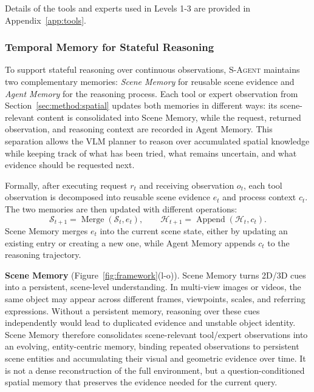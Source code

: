 Details of the tools and experts used in Levels 1-3 are provided in Appendix~\ref{app:tools}.


\subsubsection{Temporal Memory for Stateful Reasoning}
\label{sec:method:memory}
To support stateful reasoning over continuous observations, \textsc{S-Agent} maintains two complementary memories: \textit{Scene Memory} for reusable scene evidence and \textit{Agent Memory} for the reasoning process. 
Each tool or expert observation from Section~\ref{sec:method:spatial} updates both memories in different ways: its scene-relevant content is consolidated into Scene Memory, while the request, returned observation, and reasoning context are recorded in Agent Memory. 
This separation allows the VLM planner to reason over accumulated spatial knowledge while keeping track of what has been tried, what remains uncertain, and what evidence should be requested next.

Formally, after executing request $r_t$ and receiving observation $o_t$, each tool observation is decomposed into reusable scene evidence $e_t$ and process context $c_t$. 
The two memories are then updated with different operations:
\vspace{-2mm}
\[
    \mathcal{S}_{t+1} = \operatorname{Merge}(\mathcal{S}_t, e_t),
    \qquad
    \mathcal{H}_{t+1} = \operatorname{Append}(\mathcal{H}_t, c_t).
\]
Scene Memory merges $e_t$ into the current scene state, either by updating an existing entry or creating a new one, while Agent Memory appends $c_t$ to the reasoning trajectory.



\textbf{Scene Memory} (Figure~\ref{fig:framework}(l-o)).
Scene Memory turns 2D/3D cues into a persistent, scene-level understanding. 
In multi-view images or videos, the same object may appear across different frames, viewpoints, scales, and referring expressions. Without a persistent memory, reasoning over these cues independently would lead to duplicated evidence and unstable object identity.
% 
Scene Memory therefore consolidates scene-relevant tool/expert observations into an evolving, entity-centric memory, binding repeated observations to persistent scene entities and accumulating their visual and geometric evidence over time. 
It is not a dense reconstruction of the full environment, but a question-conditioned spatial memory that preserves the evidence needed for the current query.

